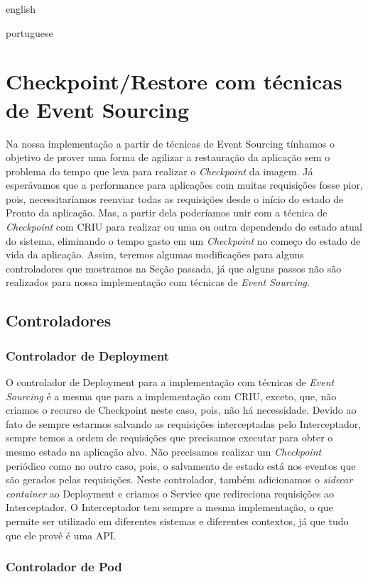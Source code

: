 \begin{otherlanguage*}{english}
\begin{otherlanguage*}{portuguese}
\section{Checkpoint/Restore com técnicas de Event Sourcing}

Na nossa implementação a partir de técnicas de Event Sourcing tínhamos o objetivo de
prover uma forma de agilizar a restauração da aplicação sem o problema do tempo que leva
para realizar o \textit{Checkpoint} da imagem. Já esperávamos que a performance para
aplicações com muitas requisições fosse pior, pois, necessitaríamos reenviar todas as
requisições desde o início do estado de Pronto da aplicação. Mas, a partir dela
poderíamos unir com a técnica de \textit{Checkpoint} com CRIU para realizar ou uma ou
outra dependendo do estado atual do sistema, eliminando o tempo gasto em um
\textit{Checkpoint} no começo do estado de vida da aplicação. Assim, teremos algumas
modificações para alguns controladores que mostramos na Seção passada, já que alguns
passos não são realizados para nossa implementação com técnicas de \textit{Event Sourcing}.

\subsection{Controladores}

\subsubsection{Controlador de Deployment}

O controlador de Deployment para a implementação com técnicas de \textit{Event Sourcing} é
a mesma que para a implementação com CRIU, exceto, que, não criamos o recurso de Checkpoint neste
caso, pois, não há necessidade. Devido ao fato de sempre estarmos salvando as requisições
interceptadas pelo Interceptador, sempre temos a ordem de requisições que precisamos
executar para obter o mesmo estado na aplicação alvo. Não precisamos realizar um
\textit{Checkpoint} periódico como no outro caso, pois, o salvamento de estado está nos
eventos que são gerados pelas requisições. Neste controlador, também adicionamos o 
\textit{sidecar container} ao Deployment e criamos o Service que redireciona requisições
ao Interceptador. O Interceptador tem sempre a mesma implementação, o que permite ser
utilizado em diferentes sistemas e diferentes contextos, já que tudo que ele provê é uma
API.

\subsubsection{Controlador de Pod}


\end{otherlanguage*}
\end{otherlanguage*}
